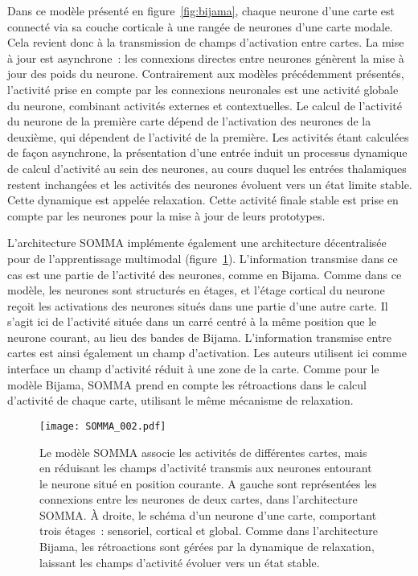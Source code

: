 \documentclass[../main]{subfiles}
\begin{document}
Dans ce modèle présenté en figure~\ref{fig:bijama}, chaque neurone d'une carte est connecté via sa couche corticale à une rangée de neurones d'une carte modale. Cela revient donc à la transmission de champs d'activation entre cartes.
La mise à jour est asynchrone~: les connexions directes entre neurones génèrent la mise à jour des poids du neurone. Contrairement aux modèles précédemment présentés, l'activité prise en compte par les connexions neuronales est une activité globale du neurone, combinant activités externes et contextuelles. 
Le calcul de l'activité du neurone de la première carte dépend de l'activation des neurones de la deuxième, qui dépendent de l'activité de la première.
Les activités étant calculées de façon asynchrone, la présentation d'une entrée induit un processus dynamique de calcul d'activité au sein des neurones, au cours duquel les entrées thalamiques restent inchangées et les activités des neurones évoluent vers un état limite stable. 
Cette dynamique est appelée relaxation.
Cette activité finale stable est prise en compte par les neurones pour la mise à jour de leurs prototypes.

L'architecture SOMMA implémente également une architecture décentralisée pour de l'apprentissage multimodal (figure~\ref{fig:somma}).
L'information transmise dans ce cas est une partie de l'activité des neurones, comme en Bijama. Comme dans ce modèle, les neurones sont structurés en étages, et l'étage cortical du neurone reçoit les activations des neurones situés dans une partie d'une autre carte.
Il s'agit ici de l'activité située dans un carré centré à la même position que le neurone courant, au lieu des bandes de Bijama.
L'information transmise entre cartes est ainsi également un champ d'activation. Les auteurs utilisent ici comme interface un champ d'activité réduit à une zone de la carte. Comme pour le modèle Bijama, SOMMA prend en compte les rétroactions dans le calcul d'activité de chaque carte, utilisant le même mécanisme de relaxation.


\begin{figure}
    \centering\texttt{[image: SOMMA\_002.pdf]}
    \caption{
        Le modèle SOMMA \parencite{lefort_unlearning_2011,lefort_apprentissage_2012} associe les activités de différentes cartes, mais en réduisant les champs d'activité transmis aux neurones entourant le neurone situé en position courante. A gauche sont représentées les connexions entre les neurones de deux cartes, dans l'architecture SOMMA. \`A droite, le schéma d'un neurone d'une carte, comportant trois étages~: sensoriel, cortical et global.
        Comme dans l'architecture Bijama, les rétroactions sont gérées par la dynamique de relaxation, laissant les champs d'activité évoluer vers un état stable.
    \label{fig:somma}}
\end{figure}
\end{document}
